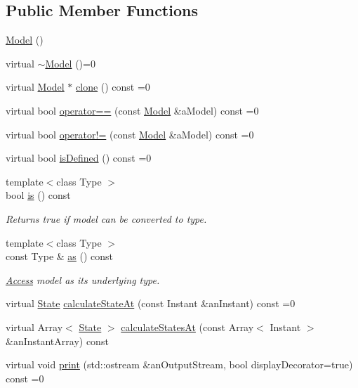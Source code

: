 \subsection*{Public Member Functions}
\begin{DoxyCompactItemize}
\item 
\hyperlink{classostk_1_1astro_1_1trajectory_1_1_model_aed4bcf4fbd44f69e97d8ff98112aa0f5}{Model} ()
\item 
virtual \hyperlink{classostk_1_1astro_1_1trajectory_1_1_model_a23acd7acccf729d8343180b83fe2f9f9}{$\sim$\+Model} ()=0
\item 
virtual \hyperlink{classostk_1_1astro_1_1trajectory_1_1_model}{Model} $\ast$ \hyperlink{classostk_1_1astro_1_1trajectory_1_1_model_ad9f1467f711b07796ddc1437fb9ad9df}{clone} () const =0
\item 
virtual bool \hyperlink{classostk_1_1astro_1_1trajectory_1_1_model_a874f79846e845859c070ce1b9874fc9c}{operator==} (const \hyperlink{classostk_1_1astro_1_1trajectory_1_1_model}{Model} \&a\+Model) const =0
\item 
virtual bool \hyperlink{classostk_1_1astro_1_1trajectory_1_1_model_a2dd77b9f6939d738f3a489f26c955340}{operator!=} (const \hyperlink{classostk_1_1astro_1_1trajectory_1_1_model}{Model} \&a\+Model) const =0
\item 
virtual bool \hyperlink{classostk_1_1astro_1_1trajectory_1_1_model_a0d5cf6f754905f06c0ec1e39618c20a1}{is\+Defined} () const =0
\item 
{\footnotesize template$<$class Type $>$ }\\bool \hyperlink{classostk_1_1astro_1_1trajectory_1_1_model_aedde1c01efbf407cca64b3f18b1a60f2}{is} () const
\begin{DoxyCompactList}\small\item\em Returns true if model can be converted to type. \end{DoxyCompactList}\item 
{\footnotesize template$<$class Type $>$ }\\const Type \& \hyperlink{classostk_1_1astro_1_1trajectory_1_1_model_a53365ee40062f5571b664998a56701e3}{as} () const
\begin{DoxyCompactList}\small\item\em \hyperlink{classostk_1_1astro_1_1_access}{Access} model as its underlying type. \end{DoxyCompactList}\item 
virtual \hyperlink{classostk_1_1astro_1_1trajectory_1_1_state}{State} \hyperlink{classostk_1_1astro_1_1trajectory_1_1_model_ad25eeaded2946bf73d44161b5f4e9a0e}{calculate\+State\+At} (const Instant \&an\+Instant) const =0
\item 
virtual Array$<$ \hyperlink{classostk_1_1astro_1_1trajectory_1_1_state}{State} $>$ \hyperlink{classostk_1_1astro_1_1trajectory_1_1_model_a3c3e4913aed2272174c0e6cd0d1a6415}{calculate\+States\+At} (const Array$<$ Instant $>$ \&an\+Instant\+Array) const
\item 
virtual void \hyperlink{classostk_1_1astro_1_1trajectory_1_1_model_a4b2098483430a820481ed50b81656e31}{print} (std\+::ostream \&an\+Output\+Stream, bool display\+Decorator=true) const =0
\end{DoxyCompactItemize}
